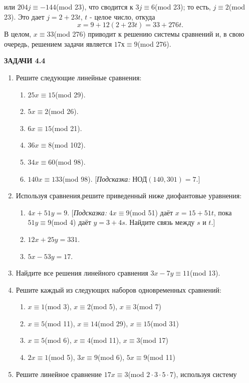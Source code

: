 \documentclass[11pt]{article}
\begin{document}
		или $204j \equiv -144$(mod 23), что сводится к $3j \equiv 6$(mod 23); то есть, $j\equiv 2$(mod 23). Это дает $j = 2 + 23t$, $t$ - целое число, откуда $$x = 9 + 12(2 + 23t) = 33 + 276t.$$ В целом, $x \equiv 33$(mod 276) приводит к решению системы сравнений и, в свою очередь, решением задачи является $17х \equiv 9$(mod 276).
	\begin{center}
		\textbf{ЗАДАЧИ 4.4}
	\end{center}
	\begin{enumerate}
	\item Решите следующие линейные сравнения:
		\begin{enumerate}
			\item $25x \equiv 15$(mod 29).
			\item $5x \equiv 2$(mod 26).
			\item $6x \equiv 15$(mod 21).
			\item $36x \equiv 8$(mod 102).
			\item $34x \equiv 60$(mod 98).
			\item $140x \equiv 133$(mod 98). [\textit{Подсказка:} НОД$(140,301) = 7$.]
		\end{enumerate}
	\item Используя сравнения,решите приведенный ниже диофантовые уравнения:
		\begin{enumerate}
			\item $4x + 51y = 9$. [\textit{Подсказка:} $4x \equiv 9$(mod 51) даёт $x = 15 + 51t$, пока $51y \equiv 9$(mod 4) даёт $y = 3 + 4s$. Найдите связь между $s$ и $t$.]
			\item $12x + 25y = 331$.
			\item $5x - 53y = 17$.	
		\end{enumerate}
	\item Найдите все решения линейного сравнения $3x - 7y \equiv 11$(mod 13).
	\item Решите каждый из следующих наборов одновременных сравнений:
		\begin{enumerate}	
		\item $x \equiv 1$(mod 3), $x \equiv 2$(mod 5), $x \equiv 3$(mod 7)
		\item $x \equiv 5$(mod 11), $x \equiv 14$(mod 29), $x \equiv 15$(mod 31)
		\item $x \equiv 5$(mod 6), $x \equiv 4$(mod 11), $x \equiv 3$(mod 17)
		\item $2x \equiv 1$(mod 5), $3x \equiv 9$(mod 6), $5x \equiv 9$(mod 11)
		\end{enumerate}
	\item Решите линейное сравнение $17x \equiv 3$(mod $2 \cdot 3 \cdot 5 \cdot 7$), используя систему

\end{enumerate}
\end{document}
